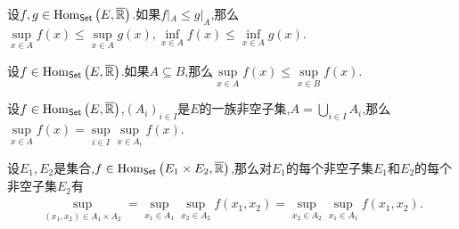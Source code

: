 \begin{proposition}{}{}
	设$f,g\in\operatorname{Hom}_{\mathsf{Set}}\left(E,\overline{\mathbb{R}}\right)$.如果$f|_{A}\leq g|_{A}$,那么$\sup\limits_{x\in A}f\left(x\right)\leq\sup\limits_{x\in A}g\left(x\right),\inf\limits_{x\in A}f\left(x\right)\leq\inf\limits_{x\in A}g\left(x\right)$.
\end{proposition}

\begin{proposition}{}{}
	设$f\in\operatorname{Hom}_{\mathsf{Set}}\left(E,\overline{\mathbb{R}}\right)$.如果$A\subseteq B$,那么$\sup\limits_{x\in A}f\left(x\right)\leq\sup\limits_{x\in B}f\left(x\right)$.
\end{proposition}

\begin{proposition}{}{}
	设$f\in\operatorname{Hom}_{\mathsf{Set}}\left(E,\overline{\mathbb{R}}\right)$,$\left(A_{i}\right)_{i\in I}$是$E$的一族非空子集,$A=\bigcup\limits_{i\in I}A_{i}$,那么$\sup\limits_{x\in A}f\left(x\right)=\sup\limits_{i\in I}\sup\limits_{x\in A_{i}}f\left(x\right)$.
\end{proposition}

\begin{proposition}{}{}
	设$E_{1},E_{2}$是集合,$f\in\operatorname{Hom}_{\mathsf{Set}}\left(E_{1}\times E_{2},\overline{\mathbb{R}}\right)$,那么对$E_{1}$的每个非空子集$E_{1}$和$E_{2}$的每个非空子集$E_{2}$有
	\begin{align*}
		\sup\limits_{\left(x_{1},x_{2}\right)\in A_{1}\times A_{2}}=\sup\limits_{x_{1}\in A_{1}}\sup\limits_{x_{2}\in A_{2}}f\left(x_{1},x_{2}\right)=\sup\limits_{x_{2}\in A_{2}}\sup\limits_{x_{1}\in A_{1}}f\left(x_{1},x_{2}\right).
	\end{align*}
\end{proposition}

